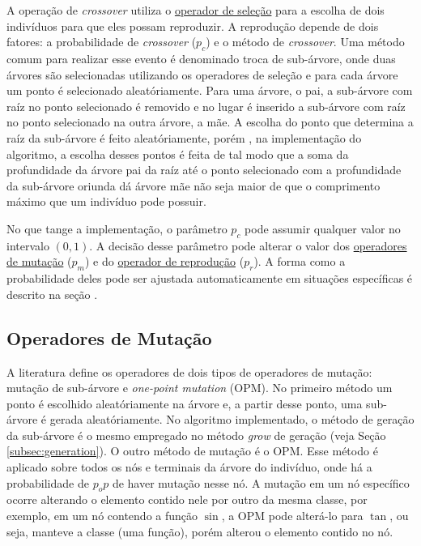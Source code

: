 \documentclass[a4paper]{paper}
\begin{document}
A operação de \textit{crossover} utiliza o \hyperref[subsec:selection]{operador
  de seleção} para a escolha de dois indivíduos para que eles possam
reproduzir. A reprodução depende de dois fatores: a probabilidade de
\textit{crossover} ($p_c$) e o método de \textit{crossover}.  Uma método comum
para realizar esse evento é denominado troca de sub-árvore, onde duas árvores
são selecionadas utilizando os operadores de seleção e para cada árvore um ponto
é selecionado aleatóriamente. Para uma árvore, o pai, a sub-árvore com raíz no
ponto selecionado é removido e no lugar é inserido a sub-árvore com raíz no
ponto selecionado na outra árvore, a mãe. A escolha do ponto que determina a
raíz da sub-árvore é feito aleatóriamente, porém , na implementação do
algoritmo, a escolha desses pontos é feita de tal modo que a soma da
profundidade da árvore pai da raíz até o ponto selecionado com a profundidade da
sub-árvore oriunda dá árvore mãe não seja maior de que o comprimento máximo que
um indivíduo pode possuir.

No que tange a implementação, o parâmetro $p_c$ pode assumir qualquer valor no
intervalo $(0, 1)$. A decisão desse parâmetro pode alterar o valor dos
\hyperref[subsec:mutation]{operadores de mutação} ($p_m$) e do
\hyperref[subsec:reproduction]{operador de reprodução} ($p_r$). A forma como a
probabilidade deles pode ser ajustada automaticamente em situações específicas é
descrito na seção .

\subsection{Operadores de Mutação} \label{subsec:mutation}

A literatura define os operadores de dois tipos de operadores de mutação:
mutação de sub-árvore e \textit{one-point mutation} (OPM). No primeiro método um
ponto é escolhido aleatóriamente na árvore e, a partir desse ponto, uma
sub-árvore é gerada aleatóriamente. No algoritmo implementado, o método de
geração da sub-árvore é o mesmo empregado no método \textit{grow} de geração
(veja Seção \ref{subsec:generation}). O outro método de mutação é o OPM. Esse
método é aplicado sobre todos os nós e terminais da árvore do indivíduo, onde há
a probabilidade de $p_op$ de haver mutação nesse nó. A mutação em um nó
específico ocorre alterando o elemento contido nele por outro da mesma classe,
por exemplo, em um nó contendo a função $\sin$, a OPM pode alterá-lo para
$\tan$, ou seja, manteve a classe (uma função), porém alterou o elemento contido
no nó.
\end{document}
